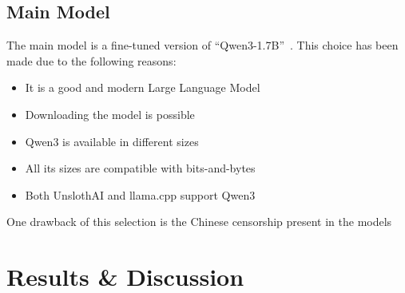 \documentclass[a4paper,11pt]{report}
\begin{document}
	    \section{Main Model}\label{sec:main-model}
	        The main model is a fine-tuned version of \enquote{Qwen3-1.7B}~\cite{qwen3}.
	        This choice has been made due to the following reasons:
	        \begin{itemize}
	        	\item It is a good and modern Large Language Model
				\item Downloading the model is possible
				\item Qwen3 is available in different sizes~\cite{qwen3}
	        	\item All its sizes are compatible with bits-and-bytes~\cite{dettmers20228bitoptimizersblockwisequantization}\cite{dettmers2023qloraefficientfinetuningquantized}
				\item Both UnslothAI and llama.cpp support Qwen3~\cite{unsloth}\cite{llamacpp}
	        \end{itemize}
	        One drawback of this selection is the Chinese censorship present in the models~\cite{lin2024chinese}
	        

	\chapter{Results \& Discussion}\label{ch:results-and-discussion}
\end{document}
